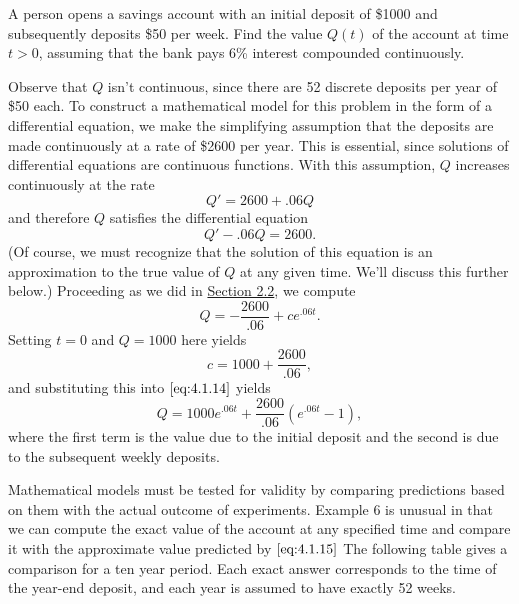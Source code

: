 \documentclass{ximera}
\begin{document}
\begin{example}\label{example:4.1.6}
A person opens a savings account with an initial deposit of \$1000 and
subsequently deposits \$50 per week. Find the value $Q(t)$ of the
account at time $t > 0$, assuming that the bank pays 6\%
interest compounded continuously.
\begin{explanation}
Observe that $Q$ isn't  continuous, since there are 52
discrete deposits per year of \$50 each. To construct a mathematical
model for this problem in the form of a differential equation, we make
the simplifying assumption that the deposits are made continuously at
a rate of \$2600 per year. This is essential, since solutions of
differential equations are continuous functions. With this assumption,
$Q$ increases continuously at the rate
$$
Q'=2600+.06 Q
$$
and therefore $Q$ satisfies the differential equation
\begin{equation} \label{eq:4.1.13}
Q'-.06Q=2600.
\end{equation}
(Of course, we must recognize that the solution of this equation
is an approximation to the true value of $Q$ at any given time. We'll
discuss this further below.)  
Proceeding as we did in \href{https://xerxes.ximera.org/differentialequations/main/linearFirstOrderDiffEq/linearFirstOrderDiffEq}{Section 2.2}, we compute
\begin{equation} \label{eq:4.1.14}
Q=-\frac{2600}{.06}+ce^{.06t}.
\end{equation}
 Setting $t=0$ and $Q=1000$ here yields
$$
c=1000+\frac{2600}{.06},
$$
and substituting this into $\eqref{eq:4.1.14}$ yields
\begin{equation} \label{eq:4.1.15}
Q=1000e^{.06t}+\frac{2600}{.06}(e^{.06t}-1),%
\end{equation}
where the first term is the value due to the initial deposit and the
second is due to the subsequent weekly deposits.
\end{explanation}
\end{example}

Mathematical models must be tested for validity by comparing
predictions based on them with the actual outcome of experiments.
Example 6 is unusual in that we can compute the exact value of the
account at any specified time and compare it with the approximate
value predicted by $\eqref{eq:4.1.15}$ %
The following table gives a comparison for a ten year period. Each exact answer corresponds to the time of the year-end deposit, and each year is assumed to have exactly 52 weeks.
\end{document}
